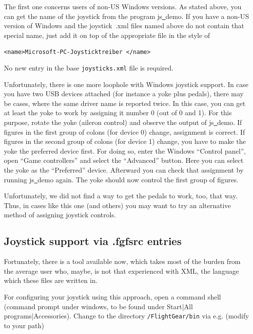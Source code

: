 The first one concerns users of non-US Windows versions. As stated above, you can get the name of the joystick from the program js\underline{~}demo. If you have a non-US version of Windows and the joystick~.xml files named above do not contain that special name, just add it on top of the appropriate file in the style of
\medskip

 \texttt{<name>Microsoft-PC-Joysticktreiber </name>}
 \medskip

\noindent
No new entry in the base \texttt{joysticks.xml} file is required.

Unfortunately, there is one more loophole with Windows joystick support. In
case you have two USB devices attached (for instance a yoke plus pedals),
there may be cases, where the same driver name is reported twice. In this
case, you can get at least the yoke to work by assigning it number 0 (out of
0 and 1). For this purpose, rotate the yoke (aileron control) and observe
the output of js\underline{~}demo. If figures in the first group of colons
(for device 0) change, assignment is correct. If figures in the second group
of colons (for device 1) change, you have to make the yoke the preferred
device first. For doing so, enter the
Windows ``Control panel'', open ``Game controllers'' and select the
``Advanced'' button. Here you can select the yoke as the ``Preferred''
device. Afterward you can check that assignment by running
js\underline{~}demo again. The yoke should now control the first group of
figures.

Unfortunately, we did not find a way to get the pedals to work, too, that way. Thus, in cases like this one (and others) you may want to try an alternative method of assigning joystick controls.


\subsection{Joystick support via .fgfsrc entries\label{fgfsrcjoy}}
Fortunately, there is a tool available now, which takes most of the burden from the average user who, maybe, is not that experienced with XML, the language which these files are written in.

For configuring your joystick using this approach, open a command shell (command prompt under windows, to be found under Start|All programs|Accessories). Change to the directory \texttt{/FlightGear/bin} via e.g. (modify to your path) 

